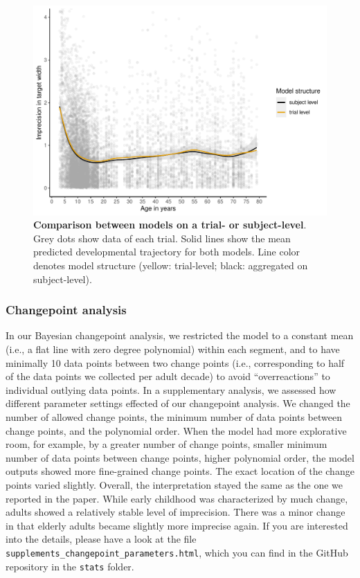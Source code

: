 \documentclass[
  man,floatsintext]{apa7}
\begin{document}
\begin{figure}[H]

{\centering \includegraphics[width=1\linewidth]{../figures/supplements_lifespan_modelstructure} 

}

\caption{\textbf{Comparison between models on a trial- or subject-level}. Grey dots show data of each trial. Solid lines show the mean predicted developmental trajectory for both models. Line color denotes model structure (yellow: trial-level; black: aggregated on subject-level).}\label{fig:fig1}
\end{figure}

\hypertarget{changepoint-analysis}{%
\subsubsection{Changepoint analysis}\label{changepoint-analysis}}

In our Bayesian changepoint analysis, we restricted the model to a constant mean (i.e., a flat line with zero degree polynomial) within each segment, and to have minimally 10 data points between two change points (i.e., corresponding to half of the data points we collected per adult decade) to avoid ``overreactions'' to individual outlying data points. In a supplementary analysis, we assessed how different parameter settings effected of our changepoint analysis. We changed the number of allowed change points, the minimum number of data points between change points, and the polynomial order. When the model had more explorative room, for example, by a greater number of change points, smaller minimum number of data points between change points, higher polynomial order, the model outputs showed more fine-grained change points. The exact location of the change points varied slightly. Overall, the interpretation stayed the same as the one we reported in the paper. While early childhood was characterized by much change, adults showed a relatively stable level of imprecision. There was a minor change in that elderly adults became slightly more imprecise again. If you are interested into the details, please have a look at the file \texttt{supplements\_changepoint\_parameters.html}, which you can find in the GitHub repository in the \texttt{stats} folder.
\end{document}
